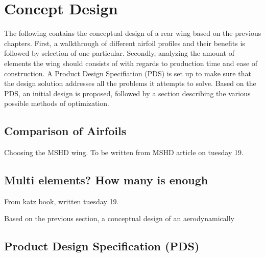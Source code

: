 \chapter{Concept Design}

  The following contains the conceptual design of a rear wing based on the previous chapters. First, a walkthrough of different airfoil profiles and their benefits is followed by selection of one particular. Secondly, analyzing the amount of elements the wing should consists of with regards to production time and ease of construction. A Product Design Specifiation (PDS) is set up to make sure that the design solution addresses all the problems it attempts to solve. Based on the PDS, an initial design is proposed, followed by a section describing the various possible methods of optimization.

  \section{Comparison of Airfoils}
    Choosing the MSHD wing.
    To be written from MSHD article on tuesday 19.

  \section{Multi elements? How many is enough}
    From katz book, written tuesday 19.

    Based on the previous section, a conceptual design of an aerodynamically

  \section{Product Design Specification (PDS)}

